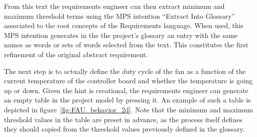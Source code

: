 From this text the requirements engineer can then
extract minimum and maximum threshold terms using the 
MPS intention ``Extract Into Glossary'' associated to the root concepts of the
\textsf{Requirements} language. When used, this MPS intention generates in the
the project's glossary an entry with the same names as words
or sets of words selected from the text. This constitutes the first refinement
of the original abstract requirement.


% 

The next step is to actually define the duty cycle of the fan as a function
of the current temperature of the controller board and whether the temperature
is going up or down. 
Given the hint is creational, the requirements engineer can generate an empty
table in the project model by pressing it. An example of such a table is
depicted in figure~\ref{fig:FAU_behavior_2d}.
Note that the minimum and maximum threshold values in the table are preset in
advance, as the process itself defines they should copied from the threshold values previously defined in the glossary.


